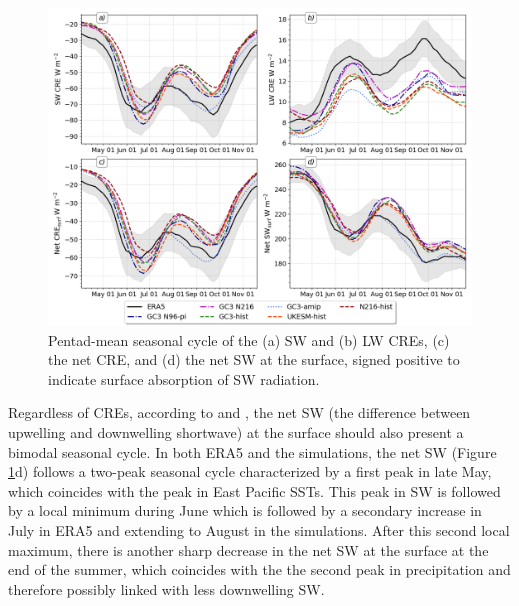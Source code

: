 \begin{figure}[t!]
\includegraphics[width=\linewidth]{figures/cre_index_seasonal.png}
\caption[Seasonal cycle of cloud-radiative effects]{Pentad-mean seasonal cycle of the (a) SW and (b)  LW CREs, (c) the net CRE, and (d) the net SW at the surface, signed positive to indicate surface absorption of SW radiation.}
\label{fig:cre_seasonal}
\end{figure}

 Regardless of CREs, according to \cite{magana1999} and \cite{karnauskas2013}, the net SW (the difference between upwelling and downwelling shortwave) at the surface should also present a bimodal seasonal cycle.
In both ERA5 and the simulations, the net SW (Figure \ref{fig:cre_seasonal}d) follows a two-peak seasonal cycle characterized by a first peak in late May, which coincides with the peak in East Pacific SSTs. This peak in SW is followed by a local minimum during June which is followed by a secondary increase in July in ERA5 and extending to August in the simulations. After this second local maximum, there is another sharp decrease in the net SW at the surface at the end of the summer, which coincides with the the second peak in precipitation and therefore possibly linked with less downwelling SW. 

